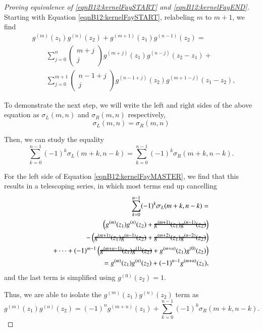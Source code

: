 \begin{proof}[Proving equivalence of \ref{eqnB12:kernelFaySTART} and \ref{eqnB12:kernelFayEND}]

Starting with Equation \ref{eqnB12:kernelFaySTART}, relabeling $m$ to $m+1$, we find
\begin{align}
    & g^{(m)}(z_1)g^{(n)}(z_2)+g^{(m+1)}(z_1)g^{(n-1)}(z_2) =
    \\ & \quad \quad \sum_{j=0}^{n} \begin{pmatrix} m+j \\ j \end{pmatrix} g^{(m+j)}(z_1) g^{(n-j)}(z_2-z_1) +
    \\ & \quad \quad \sum_{j=0}^{m+1} \begin{pmatrix} n-1+j \\ j \end{pmatrix} g^{(n-1+j)}(z_2) g^{(m+1-j)}(z_1-z_2),
\end{align}

To demonstrate the next step, we will write the left and right sides of the above equation as
$\sigma_{L}(m,n)$ and $\sigma_{R}(m,n)$ respectively,
\begin{equation}
    \sigma_L(m,n) = \sigma_R(m,n)
\end{equation}


Then, we can study the equality
\begin{equation}
    \sum_{k=0}^{n-1} (-1)^k \sigma_L(m+k,n-k) = \sum_{k=0}^{n-1} (-1)^k \sigma_R(m+k,n-k).\label{eqnB12:kernelFayMASTER}
\end{equation}

For the left side of Equation \ref{eqnB12:kernelFayMASTER}, we find that this results in a telescoping series, in which most terms end up cancelling
\begin{align}
    \sum_{k=0}^{n-1} (-1)^k \sigma_L(m+k,n-k) = \\
    \left(g^{(m)}(z_1)g^{(n)}(z_2)+\hcancel{g^{(m+1)}(z_1)g^{(n-1)}(z_2)}\right) \\
    - \left(\hcancel{g^{(m+1)}(z_1)g^{(n-1)}(z_2)}+\hcancel{g^{(m+2)}(z_1)g^{(n-2)}(z_2)}\right) \\
    + \cdots + (-1)^{m-1} \left(\hcancel{g^{(m+n-1)}(z_1)g^{(1)}(z_2)}+g^{(m+n)}(z_1)g^{(0)}(z_2)\right) \\
    = g^{(m)}(z_1)g^{(n)}(z_2) + (-1)^{n-1} g^{(m+n)}(z_1),
\end{align}
and the last term is simplified using $g^{(0)}(z_2)=1$.

Thus, we are able to isolate the $g^{(m)}(z_1)g^{(n)}(z_2)$ term as
\begin{equation}
    g^{(m)}(z_1)g^{(n)}(z_2) = (-1)^n g^{(m+n)}(z_1) + \sum_{k=0}^{n-1} (-1)^k \sigma_R(m+k,n-k).
\end{equation}


\end{proof}
